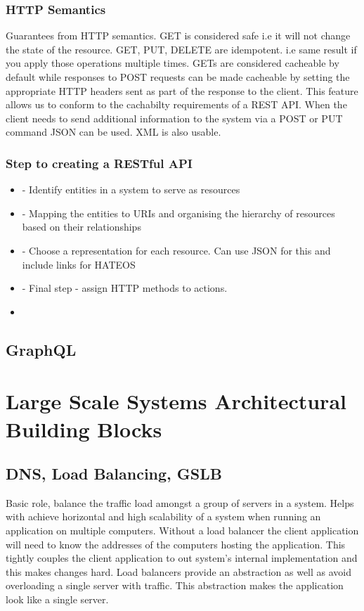 \documentclass[a4paper, 11pt]{book}
\begin{document}
    \subsection{HTTP Semantics}
    Guarantees from HTTP semantics.
    GET is considered safe i.e it will not change the state of the resource.
    GET, PUT, DELETE are idempotent. i.e same result if you apply those operations multiple times.
    GETs are considered cacheable by default while responses to POST requests can be made cacheable by setting the appropriate HTTP headers sent as part of the response to the client.
    This feature allows us to conform to the cachabilty requirements of a REST API.
    When the client needs to send additional information to the system via a POST or PUT command JSON can be used.
    XML is also usable.

    \subsection{Step to creating a RESTful API}
    \begin{itemize}
        \item - Identify entities in a system to serve as resources
        \item - Mapping the entities to URIs and organising the hierarchy of resources based on their relationships
        \item - Choose a representation for each resource. Can use JSON for this and include links for HATEOS
        \item - Final step - assign HTTP methods to actions.
        \item
    \end{itemize}


    \section{GraphQL}

    


    \chapter{Large Scale Systems Architectural Building Blocks}


    \section{DNS, Load Balancing, GSLB}
    Basic role, balance the traffic load amongst a group of servers in a system.
    Helps with achieve horizontal and high scalability of a system when running an application on multiple computers.
    Without a load balancer the client application will need to know the addresses of the computers hosting the application.
    This tightly couples the client application to out system's internal implementation and this makes changes hard.
    Load balancers provide an abstraction as well as avoid overloading a single server with traffic.
    This abstraction makes the application look like a single server.
\end{document}
